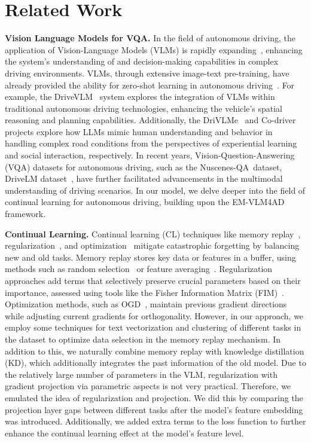 \section{Related Work}
\noindent\textbf{Vision Language Models for VQA.} In the field of autonomous driving, the application of Vision-Language Models (VLMs) is rapidly expanding~\cite{you2024v2x,Drivevlm}, enhancing the system's understanding of and decision-making capabilities in complex driving environments. VLMs, through extensive image-text pre-training, have already provided the ability for zero-shot learning in autonomous driving~\cite{vlmsurvey}. For example, the DriveVLM~\cite{Drivevlm} system explores the integration of VLMs within traditional autonomous driving technologies, enhancing the vehicle's spatial reasoning and planning capabilities. Additionally, the DriVLMe~\cite{drivlme} and Co-driver~\cite{Co-driver} projects explore how LLMs mimic human understanding and behavior in handling complex road conditions from the perspectives of experiential learning and social interaction, respectively. In recent years, Vision-Question-Answering (VQA) datasets for autonomous driving, such as the Nuscenes-QA~\cite{nuscenesqa}dataset, DriveLM dataset~\cite{drivelm}, have further facilitated advancements in the multimodal understanding of driving scenarios. In our model, we delve deeper into the field of continual learning for autonomous driving, building upon the EM-VLM4AD~\cite{EM-VLM4AD} framework.  

\noindent\textbf{Continual Learning.} Continual learning (CL) techniques like memory replay~\cite{DER}, regularization~\cite{EWC,MAS}, and optimization~\cite{GEM,OGD} mitigate catastrophic forgetting by balancing new and old tasks. Memory replay stores key data or features in a buffer, using methods such as random selection~\cite{chaudhry2019tiny} or feature averaging~\cite{iCaRL}. Regularization approaches add terms that selectively preserve crucial parameters based on their importance, assessed using tools like the Fisher Information Matrix (FIM)~\cite{EWC,EWC++}. Optimization methods, such as OGD~\cite{OGD}, maintain previous gradient directions while adjusting current gradients for orthogonality. However, in our approach, we employ some techniques for text vectorization and clustering of different tasks in the dataset to optimize data selection in the memory replay mechanism. In addition to this, we naturally combine memory replay with knowledge distillation (KD), which additionally integrates the past information of the old model. Due to the relatively large number of parameters in the VLM, regularization with gradient projection via parametric aspects is not very practical. Therefore, we emulated the idea of regularization and projection. We did this by comparing the projection layer gaps between different tasks after the model's feature embedding was introduced. Additionally, we added extra terms to the loss function to further enhance the continual learning effect at the model's feature level.